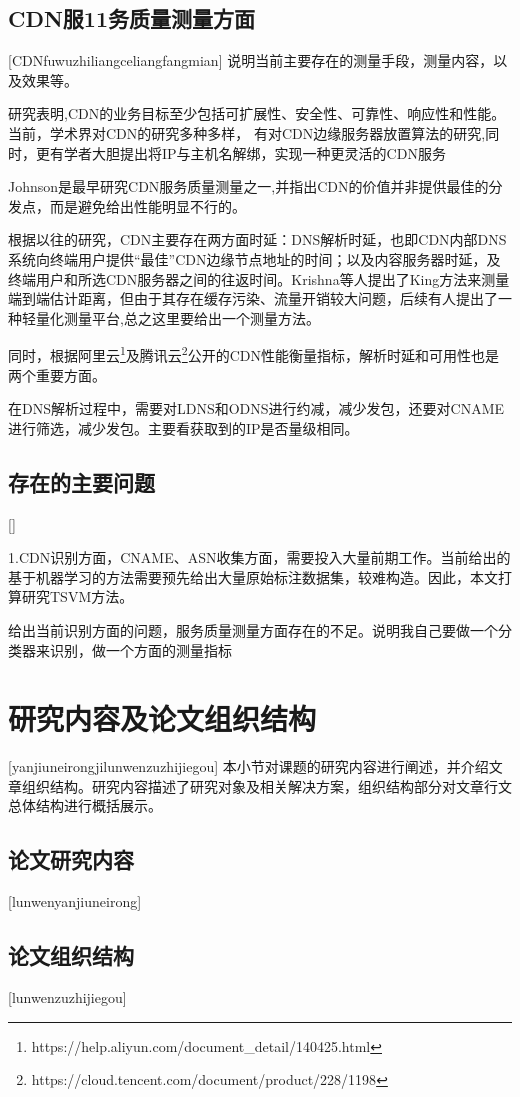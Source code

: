 \subsection{CDN服11务质量测量方面}[CDNfuwuzhiliangceliangfangmian]
说明当前主要存在的测量手段，测量内容，以及效果等。


研究\cite{Pathan-survey-2007}表明,CDN的业务目标至少包括可扩展性、安全性、可靠性、响应性和性能。
当前，学术界对CDN的研究多种多样，
有对CDN边缘服务器放置算法的研究\cite{Sahoo2016},同时，更有学者大胆提出将IP与主机名解绑\cite{Fayed-IpUnbind-2021}，实现一种更灵活的CDN服务

Johnson是最早研究CDN服务质量测量\cite{Johnson-2001-cdn-measure}之一,并指出CDN的价值并非提供最佳的分发点，而是避免给出性能明显不行的。

根据以往的研究\cite{Huang2008}，CDN主要存在两方面时延：DNS解析时延，也即CDN内部DNS系统向终端用户提供“最佳”CDN边缘节点地址的时间；以及内容服务器时延，及终端用户和所选CDN服务器之间的往返时间。Krishna等人提出了King\cite{King-2002}方法来测量端到端估计距离，但由于其存在缓存污染、流量开销较大问题，后续有人提出了一种轻量化测量平台\cite{Zhang-2021-Scale-platform},总之这里要给出一个测量方法。

同时，根据阿里云\footnote{https://help.aliyun.com/document\_detail/140425.html}及腾讯云\footnote{https://cloud.tencent.com/document/product/228/1198}公开的CDN性能衡量指标，解析时延和可用性也是两个重要方面。

在DNS解析过程中，需要对LDNS和ODNS进行约减，减少发包，还要对CNAME进行筛选，减少发包。主要看获取到的IP是否量级相同。



\subsection{存在的主要问题}[]

1.CDN识别方面，CNAME、ASN收集方面，需要投入大量前期工作。当前给出的基于机器学习的方法需要预先给出大量原始标注数据集，较难构造。因此，本文打算研究TSVM方法。


给出当前识别方面的问题，服务质量测量方面存在的不足。说明我自己要做一个分类器来识别，做一个方面的测量指标
\section{研究内容及论文组织结构}[yanjiuneirongjilunwenzuzhijiegou]
本小节对课题的研究内容进行阐述，并介绍文章组织结构。研究内容描述了研究对象及相关解决方案，组织结构部分对文章行文总体结构进行概括展示。
\subsection{论文研究内容}[lunwenyanjiuneirong]
\subsection{论文组织结构}[lunwenzuzhijiegou]

